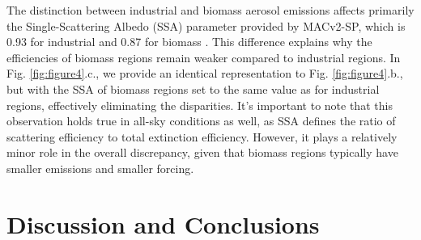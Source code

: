 \documentclass[draft]{agujournal2019}
\begin{document}
            The distinction between industrial and biomass aerosol emissions affects primarily the Single-Scattering Albedo (SSA) parameter provided by MACv2-SP, which is 0.93 for industrial and 0.87 for biomass \cite{Stevens_2017}. This difference explains why the efficiencies of biomass regions remain weaker compared to industrial regions. In Fig. \ref{fig:figure4}.c., we provide an identical representation to Fig. \ref{fig:figure4}.b., but with the SSA of biomass regions set to the same value as for industrial regions, effectively eliminating the disparities.
            It's important to note that this observation holds true in all-sky conditions as well, as SSA defines the ratio of scattering efficiency to total extinction efficiency. However, it plays a relatively minor role in the overall discrepancy, given that biomass regions typically have smaller emissions and smaller forcing.

\section{Discussion and Conclusions}
      



%
%

%
%
%
%
%
%
%
%
\end{document}
